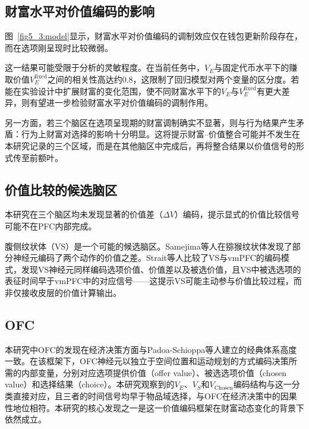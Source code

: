 \subsection{财富水平对价值编码的影响}\label{chap4_2_7:timing}

图~\ref{fig5_3:model}显示，财富水平对价值编码的调制效应仅在钱包更新阶段存在，而在选项刚呈现时比较微弱。

这一结果可能受限于分析的灵敏程度。在当前任务中，$V_E$与固定代币水平下的赚取价值$V_E^{\mathrm{fixed}}$之间的相关性高达约0.8，这限制了回归模型对两个变量的区分度。若能在实验设计中扩展财富的变化范围，使不同财富水平下的$V_E$与$V_E^{\mathrm{fixed}}$有更大差异，则有望进一步检验财富水平对价值编码的调制作用。

另一方面，若三个脑区在选项呈现期的财富调制确实不显著，则与行为结果产生矛盾：行为上财富对选择的影响十分明显。这将提示财富–价值整合可能并不发生在本研究记录的三个区域，而是在其他脑区中完成后，再将整合结果以价值信号的形式传至前额叶。

\subsection{价值比较的候选脑区}\label{chap4_2_8:deltaV}

本研究在三个脑区均未发现显著的价值差（$\Delta V$）编码，提示显式的价值比较信号可能不在PFC内部完成。

腹侧纹状体（VS）是一个可能的候选脑区。Samejima等人\citep{samejima2005representation}在猕猴纹状体发现了部分神经元编码了两个动作的价值之差。Strait等人\citep{strait2015signatures}比较了VS与vmPFC的编码模式，发现VS神经元同样编码选项价值、价值差以及被选价值，且VS中被选选项的表征时间早于vmPFC中的对应信号——这提示VS可能主动参与价值比较过程，而非仅接收皮层的价值计算输出。

\subsection{OFC}\label{chap4_2_9:OFC}

本研究中OFC的发现在经济决策方面与Padoa-Schioppa等人建立的经典体系高度一致。在该框架下，OFC神经元以独立于空间位置和运动规划的方式编码决策所需的内部变量，分别对应选项提供价值（offer value）、被选选项价值（chosen value）和选择结果（choice）\citep{padoaschioppa2006neurons,padoaschioppa2017orbitofrontal}。本研究观察到的$V_E$、$V_S$和$V_\mathrm{Chosen}$编码结构与这一分类直接对应，且三者的时间信号均早于物品域选择，与OFC在经济决策中的因果性地位相符\citep{ballesta2020values,ballesta2022orbitofrontal}。本研究的核心发现之一是这一价值编码框架在财富动态变化的背景下依然成立。

